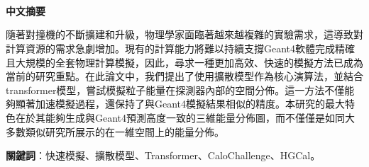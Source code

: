 
\begin{CJK}{UTF8}{bkai}
    ~ \\
    ~ \\
    ~ \\
    \huge \textbf{中文摘要}
\end{CJK}

\vspace{1.5cm}

\begin{CJK}{UTF8}{bkai}
    隨著對撞機的不斷擴建和升級，物理學家面臨著越來越複雜的實驗需求，這導致對計算資源的需求急劇增加。現有的計算能力將難以持續支撐Geant4軟體完成精確且大規模的全套物理計算模擬，因此，尋求一種更加高效、快速的模擬方法已成為當前的研究重點。在此論文中，我們提出了使用擴散模型作為核心演算法，並結合transformer模型，嘗試模擬粒子能量在探測器內部的空間分佈。這一方法不僅能夠顯著加速模擬過程，還保持了與Geant4模擬結果相似的精度。本研究的最大特色在於其能夠生成與Geant4預測高度一致的三維能量分佈圖，而不僅僅是如同大多數類似研究所展示的在一維空間上的能量分佈。

\end{CJK}

\vspace{0.5cm}

\begin{CJK}{UTF8}{bkai}
    \textbf{關鍵詞}：快速模擬、擴散模型、Transformer、CaloChallenge、HGCal。
\end{CJK}

\linespread{0}

\begin{CJK}{UTF8}{bkai}
    \clearpage
\end{CJK}


